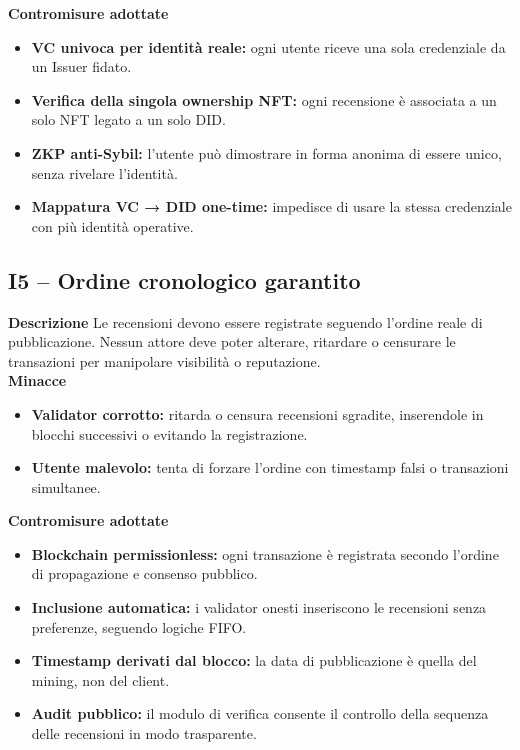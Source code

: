             \noindent \textbf{Contromisure adottate}
                \begin{itemize}
                    \item \textbf{VC univoca per identità reale:} ogni utente riceve una sola credenziale da un Issuer fidato.

                    \item \textbf{Verifica della singola ownership NFT:} ogni recensione è associata a un solo NFT legato a un solo DID.

                    \item \textbf{ZKP anti-Sybil:} l'utente può dimostrare in forma anonima di essere unico, senza rivelare l'identità.

                    \item \textbf{Mappatura VC → DID one-time:} impedisce di usare la stessa credenziale con più identità operative.
                \end{itemize}

        \subsection{I5 – Ordine cronologico garantito}
            \noindent \textbf{Descrizione}
                Le recensioni devono essere registrate seguendo l'ordine reale di pubblicazione. Nessun attore deve poter alterare, ritardare o censurare le transazioni per manipolare visibilità o reputazione. \\

            \noindent \textbf{Minacce}
                \begin{itemize}
                    \item \textbf{Validator corrotto:} ritarda o censura recensioni sgradite, inserendole in blocchi successivi o evitando la registrazione.

                    \item \textbf{Utente malevolo:} tenta di forzare l'ordine con timestamp falsi o transazioni simultanee.
                \end{itemize}

            \noindent \textbf{Contromisure adottate}
                \begin{itemize}
                    \item \textbf{Blockchain permissionless:} ogni transazione è registrata secondo l'ordine di propagazione e consenso pubblico.

                    \item \textbf{Inclusione automatica:} i validator onesti inseriscono le recensioni senza preferenze, seguendo logiche FIFO.

                    \item \textbf{Timestamp derivati dal blocco:} la data di pubblicazione è quella del mining, non del client.

                    \item \textbf{Audit pubblico:} il modulo di verifica consente il controllo della sequenza delle recensioni in modo trasparente.
                \end{itemize}

